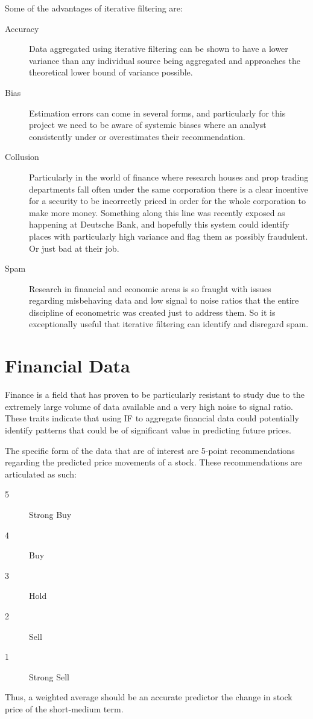Some of the advantages of iterative filtering are:
\begin{description}
    \item[Accuracy] Data aggregated using iterative filtering can be shown to have a lower variance than any individual source being aggregated and approaches the theoretical lower bound of variance possible. 
    \item[Bias] Estimation errors can come in several forms, and particularly for this project we need to be aware of systemic biases where an analyst consistently under or overestimates their recommendation.
    \item[Collusion] Particularly in the world of finance where research houses and prop trading departments fall often under the same corporation there is a clear incentive for a security to be incorrectly priced in order for the whole corporation to make more money. Something along this line was recently exposed as happening at Deutsche Bank, and hopefully this system could identify places with particularly high variance and flag them as possibly fraudulent. Or just bad at their job.
    \item[Spam] Research in financial and economic areas is so fraught with issues regarding misbehaving data and low signal to noise ratios that the entire discipline of econometric was created just to address them. So it is exceptionally useful that iterative filtering can identify and disregard spam.
\end{description}

\section{Financial Data}
Finance is a field that has proven to be particularly resistant to study due to the extremely large volume of data available and a very high noise to signal ratio. These traits indicate that using IF to aggregate financial data could potentially identify patterns that could be of significant value in predicting future prices.

The specific form of the data that are of interest are 5-point recommendations regarding the predicted price movements of a stock. These recommendations are articulated as such:
\begin{description}
    \item[5] Strong Buy
    \item[4] Buy
    \item[3] Hold
    \item[2] Sell
    \item[1] Strong Sell
\end{description}
Thus, a weighted average should be an accurate predictor the change in stock price of the short-medium term.


